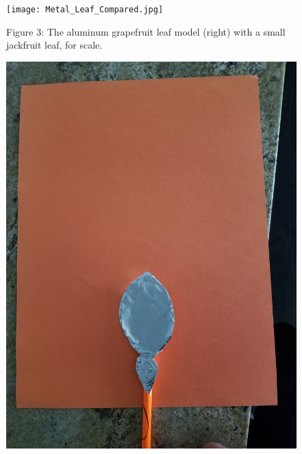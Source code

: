 \documentclass{article}
\begin{document}
\begin{figure}
    \centering
    \texttt{[image: Metal\_Leaf\_Compared.jpg]}
    \caption{Figure 3: The aluminum grapefruit leaf model (right) with a small jackfruit leaf, for scale.}
\end{figure}

\begin{figure}
    \centering
    \includegraphics{MetalLeaf.jpg}

\end{figure}
\end{document}
